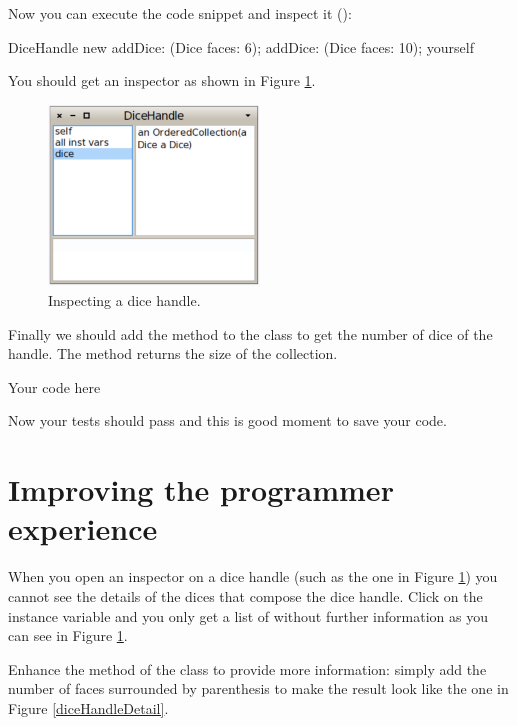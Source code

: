 \documentclass[a4paper,10pt,twoside]{book}
\begin{document}
Now you can execute the code snippet and inspect it ():


\begin{code}{}
DiceHandle new
    addDice: (Dice faces: 6);
    addDice: (Dice faces: 10);
    yourself
\end{code}


You should get an inspector as shown in Figure \ref{diceHandleNoDetail}.


\begin{figure}

\begin{center}
\includegraphics[width=0.5\textwidth]{figures/DiceHandleNoDetail.pdf}\caption{Inspecting a dice handle.\label{diceHandleNoDetail}}\end{center}
\end{figure}


Finally we should add the method  to the  class to get the number of dice of the handle. The method returns the size of the  collection.


\begin{code}{}
Your code here
\end{code}


Now your tests should pass and this is good moment to save your code.
\section{ Improving the programmer experience}
When you open an inspector on a dice handle (such as the one in Figure \ref{diceHandleNoDetail}) you cannot see the details of the dices that compose the dice handle. Click on the  instance variable and you only get a list of  without further information as you can see in Figure \ref{diceHandleNoDetail}.

Enhance the  method of the  class to provide more information: simply add the number of faces surrounded by parenthesis to make the result look like the one in Figure \ref{diceHandleDetail}.
\end{document}
